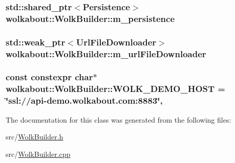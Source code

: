 \subsubsection[{\texorpdfstring{m\+\_\+persistence}{m_persistence}}]{\setlength{\rightskip}{0pt plus 5cm}std\+::shared\+\_\+ptr$<$Persistence$>$ wolkabout\+::\+Wolk\+Builder\+::m\+\_\+persistence\hspace{0.3cm}{\ttfamily [private]}}\hypertarget{classwolkabout_1_1_wolk_builder_a11719e49b1cb83d0d94bf32bfd85af9a}{}\label{classwolkabout_1_1_wolk_builder_a11719e49b1cb83d0d94bf32bfd85af9a}
\subsubsection[{\texorpdfstring{m\+\_\+url\+File\+Downloader}{m_urlFileDownloader}}]{\setlength{\rightskip}{0pt plus 5cm}std\+::weak\+\_\+ptr$<$Url\+File\+Downloader$>$ wolkabout\+::\+Wolk\+Builder\+::m\+\_\+url\+File\+Downloader\hspace{0.3cm}{\ttfamily [private]}}\hypertarget{classwolkabout_1_1_wolk_builder_aa39d6efb64ed5718138f49dd54b5cc97}{}\label{classwolkabout_1_1_wolk_builder_aa39d6efb64ed5718138f49dd54b5cc97}
\subsubsection[{\texorpdfstring{W\+O\+L\+K\+\_\+\+D\+E\+M\+O\+\_\+\+H\+O\+ST}{WOLK_DEMO_HOST}}]{\setlength{\rightskip}{0pt plus 5cm}const constexpr char$\ast$ wolkabout\+::\+Wolk\+Builder\+::\+W\+O\+L\+K\+\_\+\+D\+E\+M\+O\+\_\+\+H\+O\+ST = \char`\"{}ssl\+://api-\/demo.\+wolkabout.\+com\+:8883\char`\"{}\hspace{0.3cm}{\ttfamily [static]}, {\ttfamily [private]}}\hypertarget{classwolkabout_1_1_wolk_builder_ab9b16b4491563b96dc96d90a7e541f5c}{}\label{classwolkabout_1_1_wolk_builder_ab9b16b4491563b96dc96d90a7e541f5c}


The documentation for this class was generated from the following files\+:\begin{DoxyCompactItemize}
\item 
src/\hyperlink{_wolk_builder_8h}{Wolk\+Builder.\+h}\item 
src/\hyperlink{_wolk_builder_8cpp}{Wolk\+Builder.\+cpp}\end{DoxyCompactItemize}
